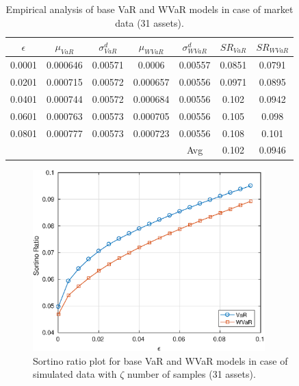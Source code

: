 \documentclass[12pt]{article}
\numberwithin{equation}{section}
\begin{document}
\begin{table}[!h]
\centering
\captionsetup{justification=centering}
\begin{tabular}{||c|c|c|c|c|c|c||}
\hline
$\epsilon$ & $\mu_{VaR}$ & $\sigma_{VaR}^{d}$ & $\mu_{WVaR}$ & $\sigma_{WVaR}^{d}$ & $SR_{VaR}$ & $SR_{WVaR}$\\
\hline
0.0001 & 0.000646 & 0.00571 & 0.0006 & 0.00557 & 0.0851 & 0.0791 \\
0.0201 & 0.000715 & 0.00572 & 0.000657 & 0.00556 & 0.0971 & 0.0895 \\
0.0401 & 0.000744 & 0.00572 & 0.000684 & 0.00556 & 0.102 & 0.0942 \\
0.0601 & 0.000763 & 0.00573 & 0.000705 & 0.00556 & 0.105 & 0.098 \\
0.0801 & 0.000777 & 0.00573 & 0.000723 & 0.00556 & 0.108 & 0.101 \\
\hline
& & & & Avg & 0.102 & 0.0946 \\
\hline
\end{tabular}
\caption{Empirical analysis of base VaR and WVaR models in case of market data (31 assets).}
\label{tab:5.1}
\end{table}

\begin{figure}[!h]
\centering
\includegraphics[height=7.0cm]{var_30s_exact.eps}
\caption{Sortino ratio plot for base VaR and WVaR models in case of simulated data with $\zeta$ number of samples (31 assets).}
\label{fig:5.2}
\end{figure}
\end{document}
